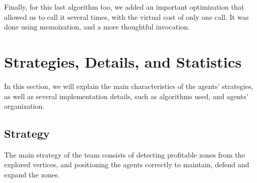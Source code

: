\documentclass{llncs2e/llncs}
\begin{document}
    Finally, for this last algorithm too, we added an important optimization 
    that allowed us to call it several times, with the virtual cost of only one 
    call. It was done using memoization, and a more thoughtful invocation.


\section{Strategies, Details, and Statistics}

    
    In this section, we will explain the main characteristics of the agents' 
    strategies, as well as several implementation details, such as algorithms
    used, and agents' organization.

\subsection{Strategy}

    The main strategy of the team consists of detecting profitable zones from the 
    explored vertices, and positioning the agents correctly to maintain, defend 
    and expand the zones. 
    
\end{document}
